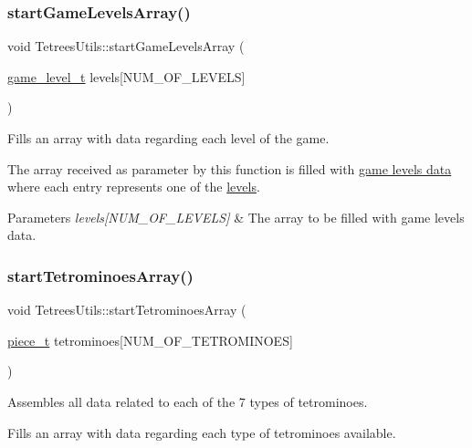 \subsubsection{\texorpdfstring{start\+Game\+Levels\+Array()}{startGameLevelsArray()}}
{\footnotesize\ttfamily void Tetrees\+Utils\+::start\+Game\+Levels\+Array (\begin{DoxyParamCaption}\item[{\hyperlink{structgame__level__t}{game\+\_\+level\+\_\+t}}]{levels\mbox{[}\+N\+U\+M\+\_\+\+O\+F\+\_\+\+L\+E\+V\+E\+L\+S\mbox{]} }\end{DoxyParamCaption})}



Fills an array with data regarding each level of the game. 

The array received as parameter by this function is filled with \hyperlink{structgame__level__t}{game levels\textquotesingle{} data} where each entry represents one of the \hyperlink{TetreesDefs_8hpp_ac7faaacc16f5e7962108661dfc411257}{levels}. 
\begin{DoxyParams}{Parameters}
{\em levels\mbox{[}\+N\+U\+M\+\_\+\+O\+F\+\_\+\+L\+E\+V\+E\+L\+S\mbox{]}} & The array to be filled with game levels\textquotesingle{} data. \\
\hline
\end{DoxyParams}
\mbox{\label{classTetreesUtils_acb377319f6772d9e88f677273c895912}} 
\subsubsection{\texorpdfstring{start\+Tetrominoes\+Array()}{startTetrominoesArray()}}
{\footnotesize\ttfamily void Tetrees\+Utils\+::start\+Tetrominoes\+Array (\begin{DoxyParamCaption}\item[{\hyperlink{structpiece__t}{piece\+\_\+t}}]{tetrominoes\mbox{[}\+N\+U\+M\+\_\+\+O\+F\+\_\+\+T\+E\+T\+R\+O\+M\+I\+N\+O\+E\+S\mbox{]} }\end{DoxyParamCaption})}



Assembles all data related to each of the 7 types of tetrominoes. 

Fills an array with data regarding each type of tetrominoes available.

